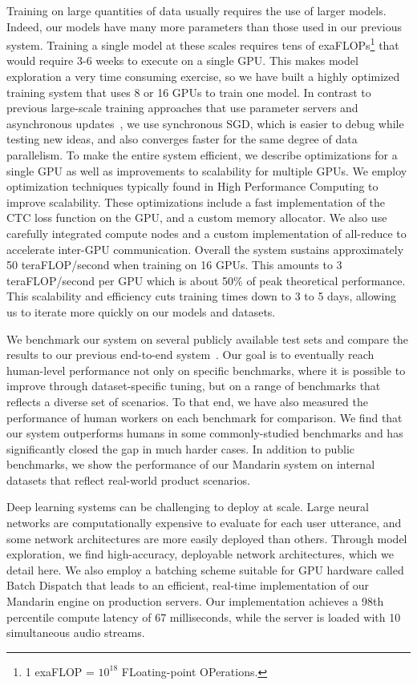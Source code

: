 Training on large quantities of data usually requires the use of larger models.
Indeed, our models have many more parameters than those used in our previous
system. Training a single model at these scales requires tens of
exaFLOPs\footnote{1 exaFLOP = $10^{18}$ FLoating-point OPerations.} that would
require 3-6 weeks to execute on a single GPU. This makes model exploration a
very time consuming exercise, so we have built a highly optimized training
system that uses 8 or 16 GPUs to train one model. In contrast to previous
large-scale training approaches that use parameter servers and asynchronous
updates~\cite{dean2012, chilimbi2014}, we use synchronous SGD, which is easier
to debug while testing new ideas, and also converges faster for the same degree
of data parallelism. To make the entire system efficient, we describe
optimizations for a single GPU as well as improvements to scalability for
multiple GPUs. We employ optimization techniques typically found in High
Performance Computing to improve scalability. These optimizations include a
fast implementation of the CTC loss function on the GPU, and a custom memory
allocator. We also use carefully integrated compute nodes and a custom
implementation of all-reduce to accelerate inter-GPU communication. Overall the
system sustains approximately 50 teraFLOP/second when training on 16 GPUs. This
amounts to 3 teraFLOP/second per GPU which is about 50\% of peak theoretical
performance. This scalability and efficiency cuts training times down to 3 to 5
days, allowing us to iterate more quickly on our models and datasets.

We benchmark our system on several publicly available test sets and compare the
results to our previous end-to-end system~\cite{hannun2014deepspeech}. Our goal
is to eventually reach human-level performance not only on specific benchmarks,
where it is possible to improve through dataset-specific tuning, but on a range
of benchmarks that reflects a diverse set of scenarios. To that end, we have
also measured the performance of human workers on each benchmark for
comparison. We find that our system outperforms humans in some commonly-studied
benchmarks and has significantly closed the gap in much harder cases. In
addition to public benchmarks, we show the performance of our Mandarin system
on internal datasets that reflect real-world product scenarios.

Deep learning systems can be challenging to deploy at scale. Large neural
networks are computationally expensive to evaluate for each user utterance, and
some network architectures are more easily deployed than others. Through model
exploration, we find high-accuracy, deployable network architectures, which we
detail here. We also employ a batching scheme suitable for GPU hardware called
Batch Dispatch that leads to an efficient, real-time implementation of our
Mandarin engine on production servers. Our implementation achieves a 98th
percentile compute latency of 67 milliseconds, while the server is loaded with
10 simultaneous audio streams.
